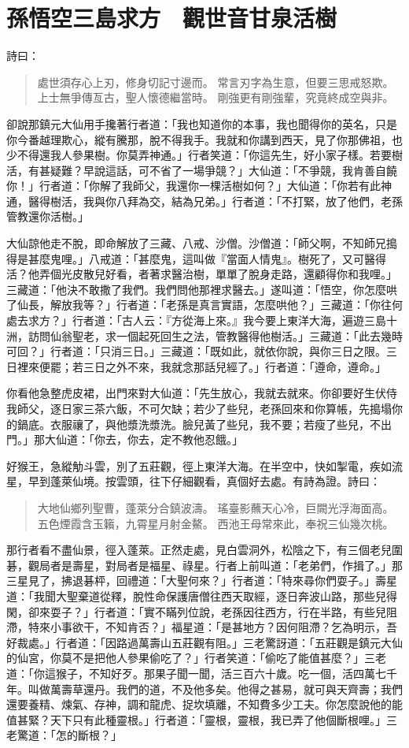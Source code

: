 
\chapter{孫悟空三島求方　觀世音甘泉活樹}

詩曰：
\begin{quote}
處世須存心上刃，修身切記寸邊而。
常言刃字為生意，但要三思戒怒欺。
上士無爭傳亙古，聖人懷德繼當時。
剛強更有剛強輩，究竟終成空與非。
\end{quote}

卻說那鎮元大仙用手攙著行者道：「我也知道你的本事，我也聞得你的英名，只是你今番越理欺心，縱有騰那，脫不得我手。我就和你講到西天，見了你那佛祖，也少不得還我人參果樹。你莫弄神通。」行者笑道：「你這先生，好小家子樣。若要樹活，有甚疑難？早說這話，可不省了一場爭競？」大仙道：「不爭競，我肯善自饒你！」行者道：「你解了我師父，我還你一棵活樹如何？」大仙道：「你若有此神通，醫得樹活，我與你八拜為交，結為兄弟。」行者道：「不打緊，放了他們，老孫管教還你活樹。」

大仙諒他走不脫，即命解放了三藏、八戒、沙僧。沙僧道：「師父啊，不知師兄搗得是甚麼鬼哩。」八戒道：「甚麼鬼，這叫做『當面人情鬼』。樹死了，又可醫得活？他弄個光皮散兒好看，者著求醫治樹，單單了脫身走路，還顧得你和我哩。」三藏道：「他決不敢撒了我們。我們問他那裡求醫去。」遂叫道：「悟空，你怎麼哄了仙長，解放我等？」行者道：「老孫是真言實語，怎麼哄他？」三藏道：「你往何處去求方？」行者道：「古人云：『方從海上來。』我今要上東洋大海，遍遊三島十洲，訪問仙翁聖老，求一個起死回生之法，管教醫得他樹活。」三藏道：「此去幾時可回？」行者道：「只消三日。」三藏道：「既如此，就依你說，與你三日之限。三日裡來便罷；若三日之外不來，我就念那話兒經了。」行者道：「遵命，遵命。」

你看他急整虎皮裙，出門來對大仙道：「先生放心，我就去就來。你卻要好生伏侍我師父，逐日家三茶六飯，不可欠缺；若少了些兒，老孫回來和你算帳，先搗塌你的鍋底。衣服禳了，與他漿洗漿洗。臉兒黃了些兒，我不要；若瘦了些兒，不出門。」那大仙道：「你去，你去，定不教他忍餓。」

好猴王，急縱觔斗雲，別了五莊觀，徑上東洋大海。在半空中，快如掣電，疾如流星，早到蓬萊仙境。按雲頭，往下仔細觀看，真個好去處。有詩為證。詩曰：
\begin{quote}
大地仙鄉列聖曹，蓬萊分合鎮波濤。
瑤臺影蘸天心冷，巨闕光浮海面高。
五色煙霞含玉籟，九霄星月射金鰲。
西池王母常來此，奉祝三仙幾次桃。
\end{quote}

那行者看不盡仙景，徑入蓬萊。正然走處，見白雲洞外，松陰之下，有三個老兒圍碁，觀局者是壽星，對局者是福星、祿星。行者上前叫道：「老弟們，作揖了。」那三星見了，拂退碁枰，回禮道：「大聖何來？」行者道：「特來尋你們耍子。」壽星道：「我聞大聖棄道從釋，脫性命保護唐僧往西天取經，逐日奔波山路，那些兒得閑，卻來耍子？」行者道：「實不瞞列位說，老孫因往西方，行在半路，有些兒阻滯，特來小事欲干，不知肯否？」福星道：「是甚地方？因何阻滯？乞為明示，吾好裁處。」行者道：「因路過萬壽山五莊觀有阻。」三老驚訝道：「五莊觀是鎮元大仙的仙宮，你莫不是把他人參果偷吃了？」行者笑道：「偷吃了能值甚麼？」三老道：「你這猴子，不知好歹。那果子聞一聞，活三百六十歲。吃一個，活四萬七千年。叫做萬壽草還丹。我們的道，不及他多矣。他得之甚易，就可與天齊壽；我們還要養精、煉氣、存神，調和龍虎、捉坎填離，不知費多少工夫。你怎麼說他的能值甚緊？天下只有此種靈根。」行者道：「靈根，靈根，我已弄了他個斷根哩。」三老驚道：「怎的斷根？」

